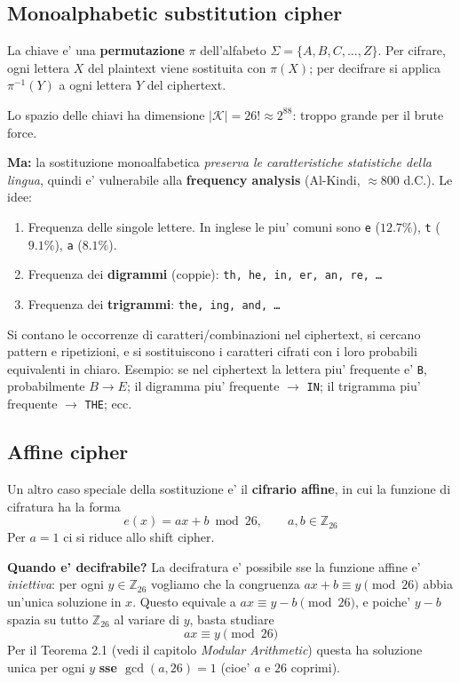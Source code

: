 \subsection{Monoalphabetic substitution cipher}
La chiave e' una \textbf{permutazione} $\pi$ dell'alfabeto $\Sigma = \{A, B, C, \dots, Z\}$. Per cifrare, ogni lettera $X$ del plaintext viene sostituita con $\pi(X)$; per decifrare si applica $\pi^{-1}(Y)$ a ogni lettera $Y$ del ciphertext.

Lo spazio delle chiavi ha dimensione $|\mathcal{K}| = 26! \approx 2^{88}$: troppo grande per il brute force.

\textbf{Ma:} la sostituzione monoalfabetica \textit{preserva le caratteristiche statistiche della lingua}, quindi e' vulnerabile alla \textbf{frequency analysis} (Al-Kindi, $\approx 800$ d.C.). Le idee:
\begin{enumerate}
  \item Frequenza delle singole lettere. In inglese le piu' comuni sono \texttt{e} ($12.7\%$), \texttt{t} ($9.1\%$), \texttt{a} ($8.1\%$).
  \item Frequenza dei \textbf{digrammi} (coppie): \texttt{th, he, in, er, an, re, \dots}
  \item Frequenza dei \textbf{trigrammi}: \texttt{the, ing, and, \dots}
\end{enumerate}
Si contano le occorrenze di caratteri/combinazioni nel ciphertext, si cercano pattern e ripetizioni, e si sostituiscono i caratteri cifrati con i loro probabili equivalenti in chiaro. Esempio: se nel ciphertext la lettera piu' frequente e' \texttt{B}, probabilmente $B \to E$; il digramma piu' frequente $\to$ \texttt{IN}; il trigramma piu' frequente $\to$ \texttt{THE}; ecc.

\subsection{Affine cipher}
Un altro caso speciale della sostituzione e' il \textbf{cifrario affine}, in cui la funzione di cifratura ha la forma
\[
  e(x) = a x + b \bmod 26, \qquad a, b \in \mathbb{Z}_{26}
\]
Per $a = 1$ ci si riduce allo shift cipher.

\textbf{Quando e' decifrabile?} La decifratura e' possibile sse la funzione affine e' \textit{iniettiva}: per ogni $y \in \mathbb{Z}_{26}$ vogliamo che la congruenza $a x + b \equiv y \pmod{26}$ abbia un'unica soluzione in $x$. Questo equivale a $a x \equiv y - b \pmod{26}$, e poiche' $y - b$ spazia su tutto $\mathbb{Z}_{26}$ al variare di $y$, basta studiare
\[
  a x \equiv y \pmod{26}
\]
Per il Teorema 2.1 (vedi il capitolo \textit{Modular Arithmetic}) questa ha soluzione unica per ogni $y$ \textbf{sse $\gcd(a, 26) = 1$} (cioe' $a$ e $26$ coprimi).

